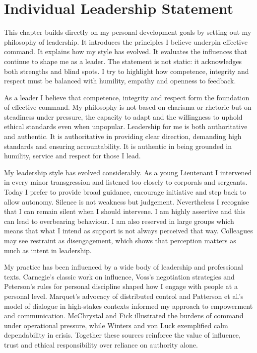 \chapter{Individual Leadership Statement}

This chapter builds directly on my personal development goals by setting out my philosophy of leadership.  It introduces the principles I believe underpin effective command. It explains how my style has evolved. It evaluates the influences that continue to shape me as a leader. The statement is not static:  it acknowledges both strengths and blind spots. I try to highlight how competence, integrity and respect  must be balanced with humility, empathy and openness to feedback.

As a leader I believe that competence, integrity and respect form the foundation of effective command. My philosophy is not based on charisma or rhetoric but on steadiness under pressure, the capacity to adapt and the willingness to uphold ethical standards even when unpopular. Leadership for me is both authoritative and authentic. It is authoritative in providing clear direction, demanding high standards and ensuring accountability. It is authentic in being grounded in humility, service and respect for those I lead.  

My leadership style has evolved considerably. As a young Lieutenant I intervened in every minor transgression and listened too closely to corporals and sergeants. Today I prefer to provide broad guidance, encourage initiative and step back to allow autonomy. Silence is not weakness but judgement. Nevertheless I recognise that I can remain silent when I should intervene. I am highly assertive and this can lead to overbearing behaviour. I am also reserved in large groups which means that what I intend as support is not always perceived that way. Colleagues may see restraint as disengagement, which shows that perception matters as much as intent in leadership.  

My practice has been influenced by a wide body of leadership and professional texts. Carnegie’s classic work on influence, Voss’s negotiation strategies and Peterson’s rules for personal discipline shaped how I engage with people at a personal level. Marquet’s advocacy of distributed control and Patterson et al.’s model of dialogue in high-stakes contexts informed my approach to empowerment and communication. McChrystal and Fick illustrated the burdens of command under operational pressure, while Winters and von Luck exemplified calm dependability in crisis. Together these sources reinforce the value of influence, trust and ethical responsibility over reliance on authority alone.  

